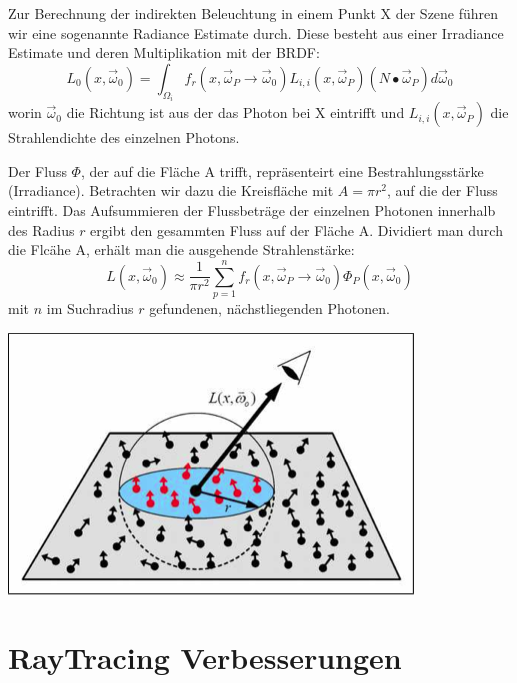 \documentclass[10pt]{article}
\begin{document}
Zur Berechnung der indirekten Beleuchtung in einem Punkt X der Szene führen wir eine sogenannte Radiance Estimate durch. Diese besteht aus einer Irradiance Estimate und deren Multiplikation mit der BRDF:
\begin{equation}
	L_0(x, \overrightarrow{\omega}_0) = \int_{\Omega_i} f_r(x, \overrightarrow{\omega}_P \rightarrow \overrightarrow{\omega}_0) L_{i,i}(x,\overrightarrow{\omega}_P)(N \bullet\overrightarrow{\omega}_P)d\overrightarrow{\omega}_0
\end{equation}
worin $\overrightarrow{\omega}_0$ die Richtung ist aus der das Photon bei X eintrifft und $L_{i,i}(x,\overrightarrow{\omega}_P)$ die Strahlendichte des einzelnen Photons.

Der Fluss  $\Phi$, der auf die Fläche A trifft, repräsenteirt eine Bestrahlungsstärke (Irradiance). Betrachten wir dazu die Kreisfläche mit $A=\pi r^2$, auf die der Fluss eintrifft. Das Aufsummieren der Flussbeträge der einzelnen Photonen innerhalb des Radius $r$ ergibt den gesammten Fluss auf der Fläche A. Dividiert man durch die Flcähe A, erhält man die ausgehende Strahlenstärke:
\begin{equation}
	L(x,\overrightarrow{\omega}_0) \approx \frac{1}{\pi r^2} \sum_{p=1}^n f_r(x, \overrightarrow{\omega}_P \rightarrow \overrightarrow{\omega}_0) \Phi_P(x, \overrightarrow{\omega}_0)
\end{equation}
mit $n$ im Suchradius $r$ gefundenen, nächstliegenden Photonen.
\begin{center}
	\includegraphics[scale=0.4]{gefundene-photonen.png}
\end{center}

\newpage
\section{RayTracing Verbesserungen}
\end{document}
